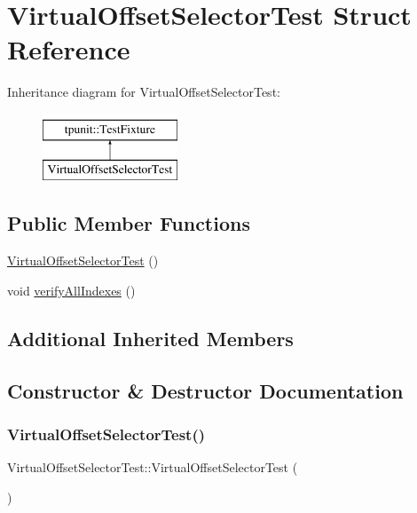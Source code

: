 \hypertarget{structVirtualOffsetSelectorTest}{}\section{Virtual\+Offset\+Selector\+Test Struct Reference}
\label{structVirtualOffsetSelectorTest}
Inheritance diagram for Virtual\+Offset\+Selector\+Test\+:\begin{figure}[H]
\begin{center}
\leavevmode
\includegraphics[height=2.000000cm]{structVirtualOffsetSelectorTest}
\end{center}
\end{figure}
\subsection*{Public Member Functions}
\begin{DoxyCompactItemize}
\item 
\mbox{\hyperlink{structVirtualOffsetSelectorTest_a96b04883afdcc85a65409907b67c2889}{Virtual\+Offset\+Selector\+Test}} ()
\item 
void \mbox{\hyperlink{structVirtualOffsetSelectorTest_a5fab79e5acfa723ce2995eee1b69264c}{verify\+All\+Indexes}} ()
\end{DoxyCompactItemize}
\subsection*{Additional Inherited Members}


\subsection{Constructor \& Destructor Documentation}
\mbox{\label{structVirtualOffsetSelectorTest_a96b04883afdcc85a65409907b67c2889}} 
\subsubsection{\texorpdfstring{VirtualOffsetSelectorTest()}{VirtualOffsetSelectorTest()}}
{\footnotesize\ttfamily Virtual\+Offset\+Selector\+Test\+::\+Virtual\+Offset\+Selector\+Test (\begin{DoxyParamCaption}{ }\end{DoxyParamCaption})\hspace{0.3cm}{\ttfamily [inline]}}



